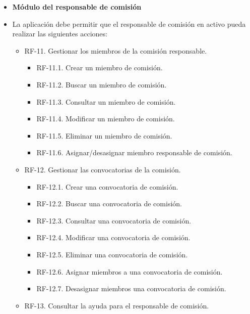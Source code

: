 \begin{itemize}
 \item \textbf{Módulo del responsable de comisión}
 \item[] La aplicación debe permitir que el responsable de comisión en activo pueda realizar las siguientes acciones:
     \begin{itemize}
         \item RF-11. Gestionar los miembros de la comisión responsable.
             \begin{itemize}
                  \item RF-11.1. Crear un miembro de comisión.
                  \item RF-11.2. Buscar un miembro de comisión.
                  \item RF-11.3. Consultar un miembro de comisión.
                  \item RF-11.4. Modificar un miembro de comisión.
                  \item RF-11.5. Eliminar un miembro de comisión.
                  \item RF-11.6. Asignar/desasignar miembro responsable de comisión.
             \end{itemize} 
         \item RF-12. Gestionar las convocatorias de la comisión.
             \begin{itemize}
                  \item RF-12.1. Crear una convocatoria de comisión.
                  \item RF-12.2. Buscar una convocatoria de comisión.
                  \item RF-12.3. Consultar una convocatoria de comisión.
                  \item RF-12.4. Modificar una convocatoria de comisión.
                  \item RF-12.5. Eliminar una convocatoria de comisión.
                  \item RF-12.6. Asignar miembros a una convocatoria de comisión.
                  \item RF-12.7. Desasignar miembros una convocatoria de comisión.
             \end{itemize} 
         \item RF-13. Consultar la ayuda para el responsable de comisión.
     \end{itemize}


\end{itemize}
